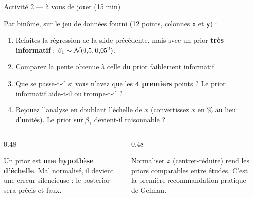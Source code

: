 \begin{frame}{Activité 2 — à vous de jouer (15 min)}
\begin{abox}[Consigne]
Par binôme, sur le jeu de données fourni  (12 points,
colonnes \texttt{x} et \texttt{y}) :
\begin{enumerate}
  \item Refaites la régression de la slide précédente, mais avec un prior
        \textbf{très informatif} : $\beta_1 \sim \mathcal{N}(0{,}5, 0{,}05^2)$.
  \item Comparez la pente obtenue à celle du prior faiblement informatif.
  \item Que se passe-t-il si vous n'avez que les \textbf{4 premiers} points ?
        Le prior informatif aide-t-il ou trompe-t-il ?
  \item Rejouez l'analyse en doublant l'échelle de $x$ (convertissez $x$ en \% au lieu d'unités).
        Le prior sur $\beta_1$ devient-il raisonnable ?
\end{enumerate}
\end{abox}
\vspace{1mm}
\begin{columns}[t]
\begin{column}{0.48\textwidth}
\begin{kbox}
Un prior est \textbf{une hypothèse d'échelle}. Mal normalisé, il devient
une erreur silencieuse : le posterior sera précis et faux.
\end{kbox}
\end{column}
\begin{column}{0.48\textwidth}
\begin{kbox}[Indice]
Normaliser $x$ (centrer-réduire) rend les priors comparables entre études.
C'est la première recommandation pratique de Gelman.
\end{kbox}
\end{column}
\end{columns}
\end{frame}

